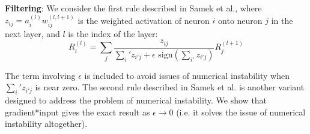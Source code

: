 \documentclass{article}
\begin{document}
{\bf Filtering}: We consider the first rule described in Samek et al., where $z_{ij} = a_i^{(l)} w_{ij}^{(l,l+1)}$ is the weighted activation of neuron $i$ onto neuron $j$ in the next layer, and $l$ is the index of the layer:
\begin{equation}
R_i^{(l)} = \sum_j \frac{z_{ij}}{\sum_i' z_{i'j} + \epsilon \text{ sign}(\sum_{i'} z_{i'j})}R_j^{(l+1)}
\end{equation}

The term involving $\epsilon$ is included to avoid issues of numerical instability when $\sum_i' z_{i'j}$ is near zero. The second rule described in Samek et al. is another variant designed to address the problem of numerical instability. We show that gradient*input gives the exact result as $\epsilon \rightarrow 0$ (i.e. it solves the issue of numerical instability altogether).
\end{document}

